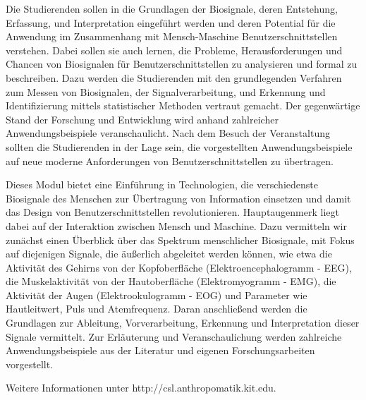 \begin{module}
\begin{learningoutcomes}
Die Studierenden sollen in die Grundlagen der Biosignale, deren Entstehung, Erfassung, und Interpretation eingeführt werden und deren Potential für die Anwendung im Zusammenhang mit Mensch-Maschine Benutzerschnittstellen verstehen. Dabei sollen sie auch lernen, die Probleme, Herausforderungen und Chancen von Biosignalen für Benutzerschnittstellen zu analysieren und formal zu beschreiben. Dazu werden die Studierenden mit den grundlegenden Verfahren zum Messen von Biosignalen, der Signalverarbeitung, und Erkennung und Identifizierung mittels statistischer Methoden vertraut gemacht. Der gegenwärtige Stand der Forschung und Entwicklung wird anhand zahlreicher Anwendungsbeispiele veranschaulicht. Nach dem Besuch der Veranstaltung sollten die Studierenden in der Lage sein, die vorgestellten Anwendungsbeispiele auf neue moderne Anforderungen von Benutzerschnittstellen zu übertragen.


\end{learningoutcomes}

\begin{content}
Dieses Modul bietet eine Einführung in Technologien, die verschiedenste Biosignale des Menschen zur Übertragung von Information einsetzen und damit das Design von Benutzerschnittstellen revolutionieren. Hauptaugenmerk liegt dabei auf der Interaktion zwischen Mensch und Maschine. Dazu vermitteln wir zunächst einen Überblick über das Spektrum menschlicher Biosignale, mit Fokus auf diejenigen Signale, die äußerlich abgeleitet werden können, wie etwa die Aktivität des Gehirns von der Kopfoberfläche (Elektroencephalogramm - EEG), die Muskelaktivität von der Hautoberfläche (Elektromyogramm - EMG), die Aktivität der Augen (Elektrookulogramm - EOG) und Parameter wie Hautleitwert, Puls und Atemfrequenz. Daran anschließend werden die Grundlagen zur Ableitung, Vorverarbeitung, Erkennung und Interpretation dieser Signale vermittelt. Zur Erläuterung und Veranschaulichung werden zahlreiche Anwendungsbeispiele aus der Literatur und eigenen Forschungsarbeiten vorgestellt.

 

Weitere Informationen unter http://csl.anthropomatik.kit.edu.


\end{content}



\end{module}

